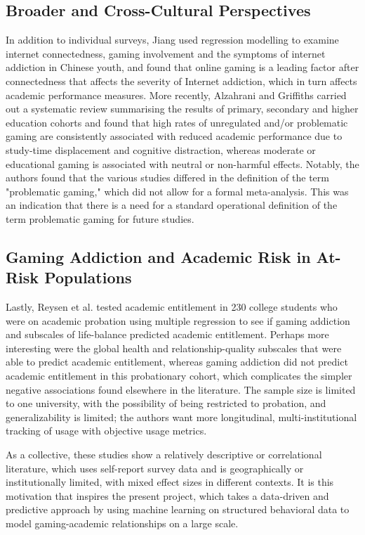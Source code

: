 \documentclass[conference]{IEEEtran}
\begin{document}
\subsection{Broader and Cross-Cultural Perspectives}
In addition to individual surveys, Jiang \cite{jiang2014} used regression modelling to examine internet connectedness, gaming involvement and the symptoms of internet addiction in Chinese youth, and found that online gaming is a leading factor after connectedness that affects the severity of Internet addiction, which in turn affects academic performance measures. More recently, Alzahrani and Griffiths \cite{alzahrani2023} carried out a systematic review summarising the results of primary, secondary and higher education cohorts and found that high rates of unregulated and/or problematic gaming are consistently associated with reduced academic performance due to study-time displacement and cognitive distraction, whereas moderate or educational gaming is associated with neutral or non-harmful effects. Notably, the authors found that the various studies differed in the definition of the term "problematic gaming," which did not allow for a formal meta-analysis. This was an indication that there is a need for a standard operational definition of the term problematic gaming for future studies.

\subsection{Gaming Addiction and Academic Risk in At-Risk Populations}
Lastly, Reysen et al. \cite{reysen2021} tested academic entitlement in 230 college students who were on academic probation using multiple regression to see if gaming addiction and subscales of life-balance predicted academic entitlement. Perhaps more interesting were the global health and relationship-quality subscales that were able to predict academic entitlement, whereas gaming addiction did not predict academic entitlement in this probationary cohort, which complicates the simpler negative associations found elsewhere in the literature. The sample size is limited to one university, with the possibility of being restricted to probation, and generalizability is limited; the authors want more longitudinal, multi-institutional tracking of usage with objective usage metrics.

As a collective, these studies show a relatively descriptive or correlational literature, which uses self-report survey data and is geographically or institutionally limited, with mixed effect sizes in different contexts. It is this motivation that inspires the present project, which takes a data-driven and predictive approach by using machine learning on structured behavioral data to model gaming-academic relationships on a large scale.
\end{document}
